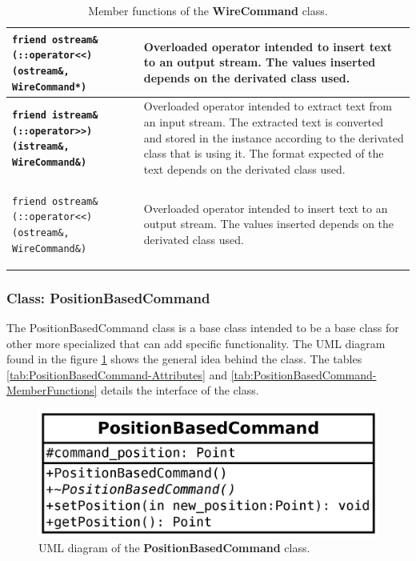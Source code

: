 \documentclass[11pt,twoside,openany,x11names,svgnames]{memoir}
\begin{document}
\begin{table}[h]
\begin{tabular}{| >{\bfseries}p{9.5cm} | p{6cm} |}
	\hline
	
	\texttt{friend ostream\& (::operator<<) (ostream\&, WireCommand*)} & Overloaded operator intended to insert text to an output stream. The values inserted depends on the derivated class used. \\
	
	\hline
	
	\texttt{friend istream\& (::operator>>) (istream\&, WireCommand\&)} & Overloaded operator intended to extract text from an input stream. The extracted text is converted and stored in the instance according to the derivated class that is using it. The format expected of the text depends on the derivated class used. \\
	
	\hline
	
	\texttt{friend ostream\& (::operator<<) (ostream\&, WireCommand\&)} & Overloaded operator intended to insert text to an output stream. The values inserted depends on the derivated class used. \\
	
	\hline
\end{tabular}
\caption{Member functions of the \textbf{WireCommand} class.}
\label{tab:WireCommand-MemberFunctions}
\end{table}

\clearpage

\subsubsection{Class: PositionBasedCommand}\label{Class-PositionBasedCommand}

The PositionBasedCommand class is a base class intended to be a base class for other more specialized that can add specific functionality. The UML diagram found in the figure \ref{fig:class-position-based-command} shows the general idea behind the class. The tables \ref{tab:PositionBasedCommand-Attributes} and \ref{tab:PositionBasedCommand-MemberFunctions} details the interface of the class.

\begin{figure}
	\centering
	\includegraphics[scale=0.2, clip=true, trim= 0pt 0pt 0pt 0pt]{images/chapter03-image21}
	\caption{UML diagram of the \textbf{PositionBasedCommand} class.}
	\label{fig:class-position-based-command}
\end{figure}
\end{document}
